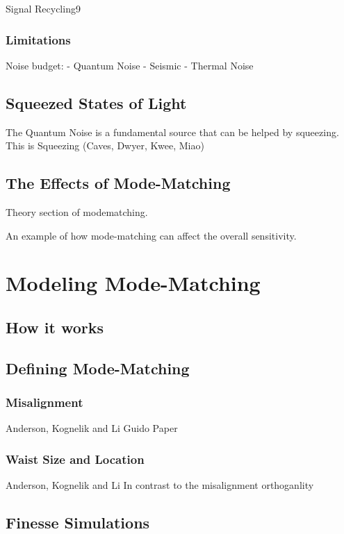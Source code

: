 \documentclass[10pt,a4paper]{book}
\begin{document}
\begin{linenumbers}
		Signal Recycling9
		\subsection{Limitations}
		Noise budget:
		- Quantum Noise
		- Seismic
		- Thermal Noise
	\section{Squeezed States of Light}
	The Quantum Noise is a fundamental source that can be helped by squeezing. This is Squeezing (Caves, Dwyer, Kwee, Miao)
		
	\section{The Effects of Mode-Matching}
	Theory section of modematching.
	
	An example of how mode-matching can affect the overall sensitivity.
	
	
	
\chapter{Modeling Mode-Matching}	
	\section{How it works}

	\section{Defining Mode-Matching}
		\subsection{Misalignment}
		Anderson, Kognelik and Li
		\newline
		Guido Paper
		\newline
		
		\subsection{Waist Size and Location}
		Anderson, Kognelik and Li
		\newline
		In contrast to the misalignment orthoganlity 
	
	\section{Finesse Simulations}

\end{linenumbers}
\end{document}
